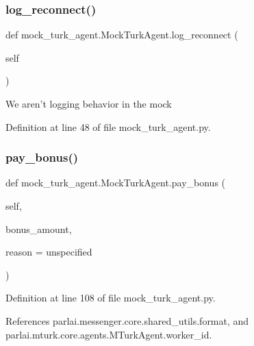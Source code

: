 \subsubsection{\texorpdfstring{log\+\_\+reconnect()}{log\_reconnect()}}
{\footnotesize\ttfamily def mock\+\_\+turk\+\_\+agent.\+Mock\+Turk\+Agent.\+log\+\_\+reconnect (\begin{DoxyParamCaption}\item[{}]{self }\end{DoxyParamCaption})}

\begin{DoxyVerb}We aren't logging behavior in the mock\end{DoxyVerb}
 

Definition at line 48 of file mock\+\_\+turk\+\_\+agent.\+py.

\mbox{\label{classmock__turk__agent_1_1MockTurkAgent_ae909aa8dfbf8f7bb7a08c2a2f4f68fac}} 
\subsubsection{\texorpdfstring{pay\+\_\+bonus()}{pay\_bonus()}}
{\footnotesize\ttfamily def mock\+\_\+turk\+\_\+agent.\+Mock\+Turk\+Agent.\+pay\+\_\+bonus (\begin{DoxyParamCaption}\item[{}]{self,  }\item[{}]{bonus\+\_\+amount,  }\item[{}]{reason = {\ttfamily \textquotesingle{}unspecified\textquotesingle{}} }\end{DoxyParamCaption})}



Definition at line 108 of file mock\+\_\+turk\+\_\+agent.\+py.



References parlai.\+messenger.\+core.\+shared\+\_\+utils.\+format, and parlai.\+mturk.\+core.\+agents.\+M\+Turk\+Agent.\+worker\+\_\+id.

\mbox{\label{classmock__turk__agent_1_1MockTurkAgent_af18590a623c605ad01d5b553addee515}} 

